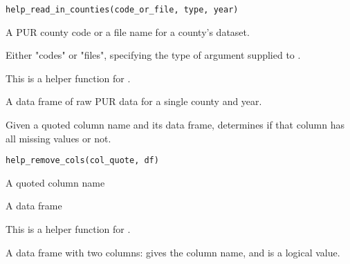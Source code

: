\documentclass[a4paper]{book}
\begin{document}
%
\begin{Usage}
\begin{verbatim}
help_read_in_counties(code_or_file, type, year)
\end{verbatim}
\end{Usage}
%
\begin{Arguments}
\begin{ldescription}
\item[\code{code\_or\_file}] A PUR county code or a file name for a county's dataset.

\item[\code{type}] Either "codes" or "files", specifying the type of argument supplied
to .
\end{ldescription}
\end{Arguments}
%
\begin{Details}\relax
This is a helper function for .
\end{Details}
%
\begin{Value}
A data frame of raw PUR data for a single county and year.
\end{Value}
%
\begin{Description}\relax
Given a quoted column name and its data frame,  determines
if that column has all missing values or not.
\end{Description}
%
\begin{Usage}
\begin{verbatim}
help_remove_cols(col_quote, df)
\end{verbatim}
\end{Usage}
%
\begin{Arguments}
\begin{ldescription}
\item[\code{col\_quote}] A quoted column name

\item[\code{df}] A data frame
\end{ldescription}
\end{Arguments}
%
\begin{Details}\relax
This is a helper function for .
\end{Details}
%
\begin{Value}
A data frame with two columns:  gives the column name, and
 is a logical value.
\end{Value}
\end{document}
